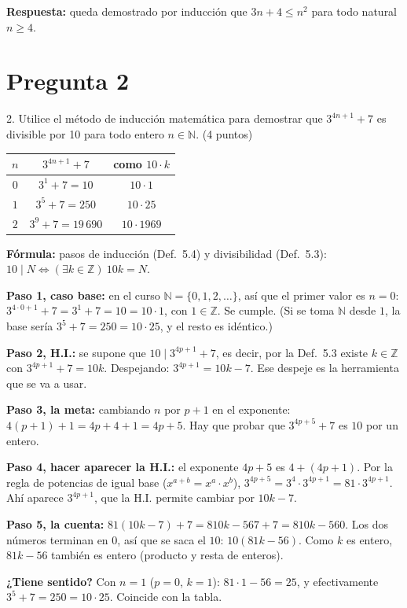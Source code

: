 \documentclass[11pt]{article}
\begin{document}
\textbf{Respuesta:} queda demostrado por inducción que $3n+4\le n^2$ para todo natural $n\ge 4$.

\clearpage
\section*{Pregunta 2}

2. Utilice el método de inducción matemática para demostrar que $3^{4n+1}+7$ es \colorbox{green!35}{divisible por 10} para todo entero \colorbox{green!35}{$n\in\mathbb N$.} \hfill (4 puntos)

\begin{center}
\renewcommand{\arraystretch}{1.3}
\begin{tabular}{|c|c|c|}
\hline
$n$ & $3^{4n+1}+7$ & como $10\cdot k$\\ \hline
$0$ & $3^1+7=10$ & $10\cdot 1$\\ \hline
$1$ & $3^5+7=250$ & $10\cdot 25$\\ \hline
$2$ & $3^9+7=19\,690$ & $10\cdot 1969$\\ \hline
\end{tabular}
\end{center}


\begin{explica}
\textbf{Fórmula:} pasos de inducción (Def.~5.4) y divisibilidad (Def.~5.3): $10\mid N\iff(\exists k\in\mathbb Z)\ 10k=N$.

\textbf{Paso 1, caso base:} en el curso $\mathbb N=\{0,1,2,\dots\}$, así que el primer valor es $n=0$: $3^{4\cdot 0+1}+7=3^1+7=10=10\cdot 1$, con $1\in\mathbb Z$. Se cumple. (Si se toma $\mathbb N$ desde $1$, la base sería $3^5+7=250=10\cdot 25$, y el resto es idéntico.)

\textbf{Paso 2, H.I.:} se supone que $10\mid 3^{4p+1}+7$, es decir, por la Def.~5.3 existe $k\in\mathbb Z$ con $3^{4p+1}+7=10k$. Despejando: $3^{4p+1}=10k-7$. Ese despeje es la herramienta que se va a usar.

\textbf{Paso 3, la meta:} cambiando $n$ por $p+1$ en el exponente: $4(p+1)+1=4p+4+1=4p+5$. Hay que probar que $3^{4p+5}+7$ es $10$ por un entero.

\textbf{Paso 4, hacer aparecer la H.I.:} el exponente $4p+5$ es $4+(4p+1)$. Por la regla de potencias de igual base ($x^{a+b}=x^a\cdot x^b$), $3^{4p+5}=3^4\cdot 3^{4p+1}=81\cdot 3^{4p+1}$. Ahí aparece $3^{4p+1}$, que la H.I. permite cambiar por $10k-7$.

\textbf{Paso 5, la cuenta:} $81(10k-7)+7=810k-567+7=810k-560$. Los dos números terminan en $0$, así que se saca el $10$: $10(81k-56)$. Como $k$ es entero, $81k-56$ también es entero (producto y resta de enteros).

\textbf{¿Tiene sentido?} Con $n=1$ ($p=0$, $k=1$): $81\cdot 1-56=25$, y efectivamente $3^5+7=250=10\cdot 25$. Coincide con la tabla.
\end{explica}
\end{document}
